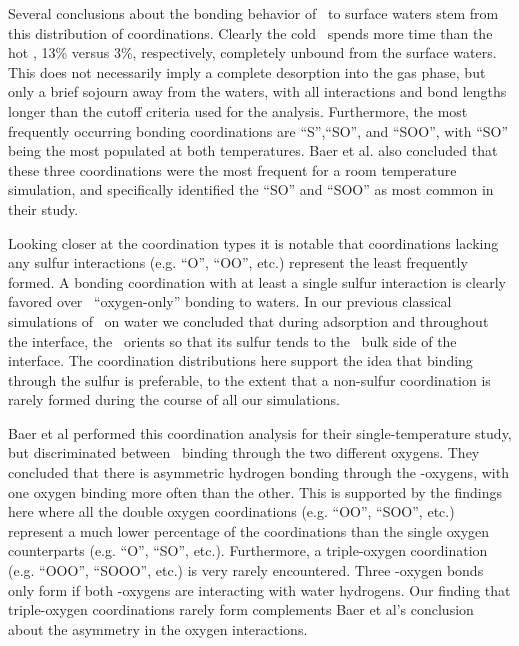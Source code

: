 	Several conclusions about the bonding behavior of \suldiox~to surface waters stem from this distribution of coordinations. Clearly the cold \suldiox~spends more time than the hot \suldiox, 13\% versus 3\%, respectively, completely unbound from the surface waters. This does not necessarily imply a complete desorption into the gas phase, but only a brief sojourn away from the waters, with all interactions and bond lengths longer than the cutoff criteria used for the analysis. Furthermore, the most frequently occurring bonding coordinations are ``S'',``SO'', and ``SOO'', with ``SO'' being the most populated at both temperatures. Baer et al. also concluded that these three coordinations were the most frequent for a room temperature simulation, and specifically identified the ``SO'' and ``SOO'' as most common in their study.\cite{Baer2010}

	Looking closer at the coordination types it is notable that coordinations lacking any sulfur interactions (e.g. ``O'', ``OO'', etc.) represent the least frequently formed. A bonding coordination with at least a single sulfur interaction is clearly favored over \suldiox~``oxygen-only'' bonding to waters. In our previous classical simulations of \suldiox~on water we concluded that during adsorption and throughout the interface, the \suldiox~orients so that its sulfur tends to the \wat~bulk side of the interface.\cite{Shamay2011} The coordination distributions here support the idea that binding through the sulfur is preferable, to the extent that a non-sulfur coordination is rarely formed during the course of all our simulations.

Baer et al performed this coordination analysis for their single-temperature study, but discriminated between \suldiox~binding through the two different oxygens. They concluded that there is asymmetric hydrogen bonding through the \suldiox-oxygens, with one oxygen binding more often than the other. This is supported by the findings here where all the double oxygen coordinations (e.g. ``OO'', ``SOO'', etc.) represent a much lower percentage of the coordinations than the single oxygen counterparts (e.g. ``O'', ``SO'', etc.). Furthermore, a triple-oxygen coordination (e.g. ``OOO'', ``SOOO'', etc.) is very rarely encountered. Three \suldiox-oxygen bonds only form if both \suldiox-oxygens are interacting with water hydrogens. Our finding that triple-oxygen coordinations rarely form complements Baer et al's conclusion about the asymmetry in the oxygen interactions.

